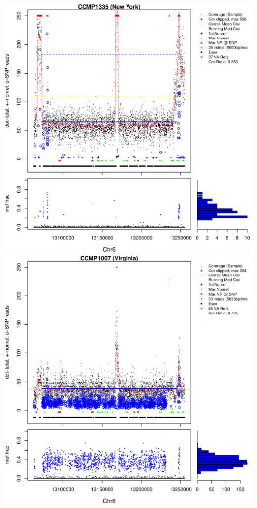 \documentclass{article}\usepackage[]{graphicx}\usepackage[]{color}
\makeatletter
\def\maxwidth{ %
  \ifdim\Gin@nat@width>\linewidth
    \linewidth
  \else
    \Gin@nat@width
  \fi
}
\newenvironment{knitrout}{}{} %
\makeatother
\begin{document}
\begin{knitrout}
{\centering \includegraphics[width=\maxwidth]{figs-knitr/unnamed-chunk-39-1} 
\includegraphics[width=\maxwidth]{figs-knitr/unnamed-chunk-39-2} 
}
\end{knitrout}
\end{document}
